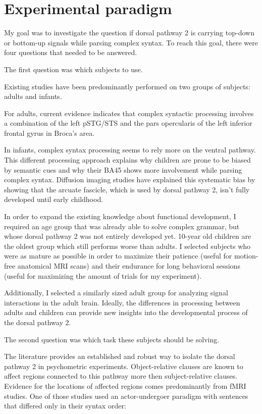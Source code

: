 \section{Experimental paradigm}

My goal was to investigate the question if dorsal pathway 2 is carrying top-down or bottom-up signals while parsing complex syntax.
To reach this goal, there were four questions that needed to be answered.


The first question was which subjects to use.

Existing studies have been predominantly performed on two groups of subjects: adults and infants.

For adults, current evidence indicates that complex syntactic processing involves a combination of the left pSTG/STS and the pars opercularis of the left inferior frontal gyrus in Broca's area.

In infants, complex syntax processing seems to rely more on the ventral pathway.
This different processing approach explains why children are prone to be biased by semantic cues and why their BA45 shows more involvement while parsing complex syntax.
Diffusion imaging studies have explained this systematic bias by showing that the arcuate fascicle, which is used by dorsal pathway 2, isn't fully developed until early childhood.

In order to expand the existing knowledge about functional development, I required an age group that was already able to solve complex grammar, but whose dorsal pathway 2 was not entirely developed yet.
10-year old children are the oldest group which still performs worse than adults.
I selected subjects who were as mature as possible in order to maximize their patience (useful for motion-free anatomical MRI scans) and their endurance for long behavioral sessions (useful for maximizing the amount of trials for my experiment).

Additionally, I selected a similarly sized adult group for analyzing signal interactions in the adult brain.
Ideally, the differences in processing between adults and children can provide new insights into the developmental process of the dorsal pathway 2.


The second question was which task these subjects should be solving.

The literature provides an established and robust way to isolate the dorsal pathway 2 in psychometric experiments.
Object-relative clauses are known to affect regions connected to this pathway more then subject-relative clauses.
Evidence for the locations of affected regions comes predominantly from fMRI studies.
One of those studies \cite{1.3.Constable} used an actor-undergoer paradigm with sentences that differed only in their syntax order:


